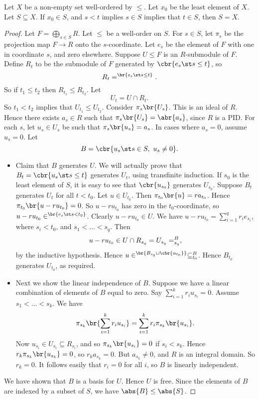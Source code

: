 \begin{corollary}
Let $ X $ be a non-empty set well-ordered by $ \le $. Let $ x_0 $ be the least element of $ X $. Let $ S \subseteq X $. If $ x_0 \in S $, and $ s < t $ implies $ s \in S $ implies that $ t \in S $, then $ S = X $.
\end{corollary}

\begin{proof}
Let $ F = \bigoplus_{s \in S} R $. Let $ \le $ be a well-order on $ S $. For $ s \in S $, let $ \pi_s $ be the projection map $ F \to R $ onto the $ s $-coordinate. Let $ e_s $ be the element of $ F $ with one in coordinate $ s $, and zero elsewhere. Suppose $ U \le F $ is an $ R $-submodule of $ F $. Define $ R_t $ to be the submodule of $ F $ generated by $ \cbr{e_s \st s \le t} $, so
$$ R_t = \sp \br{e_s \st s \le t}. $$
So if $ t_1 \le t_2 $ then $ R_{t_1} \le R_{t_2} $. Let
$$ U_t = U \cap R_t. $$
So $ t_1 < t_2 $ implies that $ U_{t_1} \le U_{t_2} $. Consider $ \pi_s\br{U_s} $. This is an ideal of $ R $. Hence there exists $ a_s \in R $ such that $ \pi_s\br{U_s} = \abr{a_s} $, since $ R $ is a PID. For each $ s $, let $ u_s \in U_s $ be such that $ \pi_s\br{u_s} = a_s $. In cases where $ a_s = 0 $, assume $ u_s = 0 $. Let
$$ B = \cbr{u_s \st s \in S, \ u_s \ne 0}. $$
\begin{itemize}
\item Claim that $ B $ generates $ U $. We will actually prove that $ B_t = \cbr{u_s \st s \le t} $ generates $ U_t $, using transfinite induction. If $ s_0 $ is the least element of $ S $, it is easy to see that $ \cbr{u_{s_0}} $ generates $ U_{s_0} $. Suppose $ B_t $ generates $ U_t $ for all $ t < t_0 $. Let $ u \in U_{t_0} $. Then $ \pi_{t_0}\br{u} = ra_{t_0} $. Hence $ \pi_{t_0}\br{u - ru_{t_0}} = 0 $. So $ u - ru_{t_0} $ has zero in the $ t_0 $-coordinate, so $ u - ru_{t_0} \in \sp \br{e_s \st s < t_0} $. Clearly $ u - ru_{t_0} \in U $. We have $ u - ru_{t_0} = \sum_{i = 1}^q r_ie_{s_i} $, where $ s_i < t_0 $, and $ s_1 < \dots < s_q $. Then
$$ u - ru_{t_0} \in U \cap R_{s_q} = U_{s_q} = \sp B_{s_q}, $$
by the inductive hypothesis. Hence $ u \in \sp \br{B_{s_q} \cup \cbr{u_{t_0}}} \subseteq \sp B_{t_0} $. Hence $ B_{t_0} $ generates $ U_{t_0} $, as required.
\item Next we show the linear independence of $ B $. Suppose we have a linear combination of elements of $ B $ equal to zero. Say $ \sum_{i = 1}^k r_iu_{s_i} = 0 $. Assume $ s_1 < \dots < s_k $. We have
$$ \pi_{s_k}\br{\sum_{i = 1}^k r_iu_{s_i}} = \sum_{i = 1}^k r_i\pi_{s_k}\br{u_{s_i}}. $$
Now $ u_{s_i} \in U_{s_i} \subseteq R_{s_i} $, and so $ \pi_{s_k}\br{u_{s_i}} = 0 $ if $ s_i < s_k $. Hence $ r_k\pi_{s_k}\br{u_{s_k}} = 0 $, so $ r_ka_{s_k} = 0 $. But $ a_{s_k} \ne 0 $, and $ R $ is an integral domain. So $ r_k = 0 $. It follows easily that $ r_i = 0 $ for all $ i $, so $ B $ is linearly independent.
\end{itemize}
We have shown that $ B $ is a basis for $ U $. Hence $ U $ is free. Since the elements of $ B $ are indexed by a subset of $ S $, we have $ \abs{B} \le \abs{S} $.
\end{proof}


